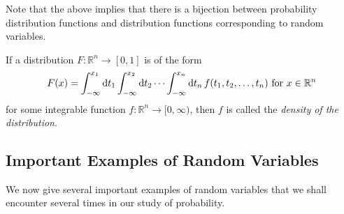 Note that the above implies that there is a bijection between probability distribution functions and distribution functions corresponding to random variables.

\begin{definition}
    If a distribution $F:\mathbb{R}^n\to[0,1]$ is of the form
    $$F(x)=\int_{-\infty}^{x_1}\operatorname{d}\!{t_1}\int_{-\infty}^{x_2}\operatorname{d}\!{t_2}\cdots\int_{-\infty}^{x_n}\operatorname{d}\!{t_n}\, f(t_1,t_2,\ldots,t_n)\text{ for }x\in\mathbb{R}^n$$
    for some integrable function $f:\mathbb{R}^n\to[0,\infty)$, then $f$ is called the \textit{density of the distribution}.
\end{definition}

\subsection{Important Examples of Random Variables}

We now give several important examples of random variables that we shall encounter several times in our study of probability.

